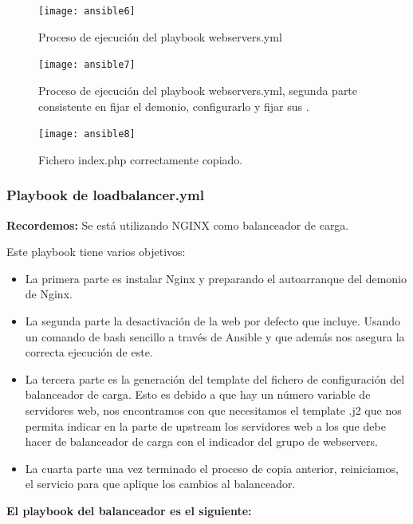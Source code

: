 

\begin{figure}[H]
	\centering
	\texttt{[image: ansible6]}
	\caption{Proceso de ejecución del playbook webservers.yml}
\end{figure}

\begin{figure}[H]
	\centering
	\texttt{[image: ansible7]}
	\caption{Proceso de ejecución del playbook webservers.yml, segunda parte consistente en fijar el demonio, configurarlo y fijar sus . }
\end{figure}

\begin{figure}[H]
	\centering
	\texttt{[image: ansible8]}
	\caption{Fichero index.php correctamente copiado.}
\end{figure}

\newpage
\subsubsection{Playbook de loadbalancer.yml}

\textbf{Recordemos:} Se está utilizando NGINX como balanceador de carga.

Este playbook tiene varios objetivos:

\begin{itemize}
	\item La primera parte es instalar Nginx y preparando el autoarranque del demonio de Nginx.
	\item La segunda parte la desactivación de la web por defecto que incluye. Usando un comando de bash sencillo a través de Ansible y que además nos asegura la correcta ejecución de este.
	\item La tercera parte es la generación del template del fichero de configuración del balanceador de carga. Esto es debido a que hay un número variable de servidores web, nos encontramos con que necesitamos el template .j2 que nos permita indicar en la parte de upstream los servidores web a los que debe hacer de balanceador de carga con el indicador del grupo de webservers.
	\item La cuarta parte una vez terminado el proceso de copia anterior, reiniciamos, el servicio para que aplique los cambios al balanceador.
\end{itemize}

\textbf{El playbook del balanceador es el siguiente:}
\vspace{5mm}

\vspace{5mm}

